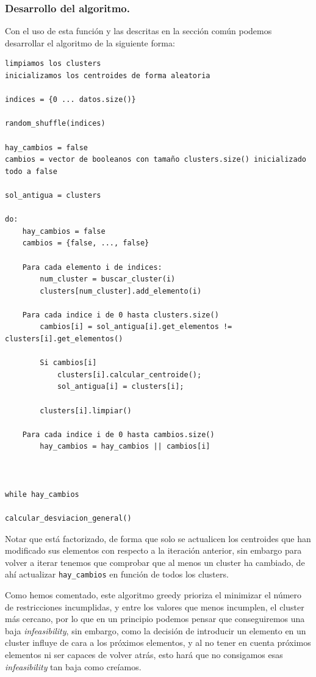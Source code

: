 \documentclass[12pt, spanish]{article}
\begin{document}
\subsubsection{Desarrollo del algoritmo.}

Con el uso de esta función y las descritas en la sección común podemos desarrollar el algoritmo de la siguiente forma:

\begin{lstlisting}
limpiamos los clusters
inicializamos los centroides de forma aleatoria

indices = {0 ... datos.size()}

random_shuffle(indices)

hay_cambios = false
cambios = vector de booleanos con tamaño clusters.size() inicializado todo a false

sol_antigua = clusters

do:
	hay_cambios = false
	cambios = {false, ..., false}
	
	Para cada elemento i de indices:
		num_cluster = buscar_cluster(i)
		clusters[num_cluster].add_elemento(i)
		
	Para cada indice i de 0 hasta clusters.size()
		cambios[i] = sol_antigua[i].get_elementos != clusters[i].get_elementos()
		
		Si cambios[i]
			clusters[i].calcular_centroide();
			sol_antigua[i] = clusters[i];
			
		clusters[i].limpiar()
		
	Para cada indice i de 0 hasta cambios.size()
		hay_cambios = hay_cambios || cambios[i]



while hay_cambios

calcular_desviacion_general()
\end{lstlisting}

Notar que está factorizado, de forma que solo se actualicen los centroides que han modificado sus elementos con respecto a la iteración anterior, sin embargo para volver a iterar tenemos que comprobar que al menos un cluster ha cambiado, de ahí actualizar \texttt{hay\_cambios} en función de todos los clusters.

Como hemos comentado, este algoritmo greedy prioriza el minimizar el número de restricciones incumplidas, y entre los valores que menos incumplen, el cluster más cercano, por lo que en un principio podemos pensar que conseguiremos una baja \textit{infeasibility}, sin embargo, como la decisión de introducir un elemento en un cluster influye de cara a los próximos elementos, y al no tener en cuenta próximos elementos ni ser capaces de volver atrás, esto hará que no consigamos esas \textit{infeasibility} tan baja como creíamos.
\end{document}
